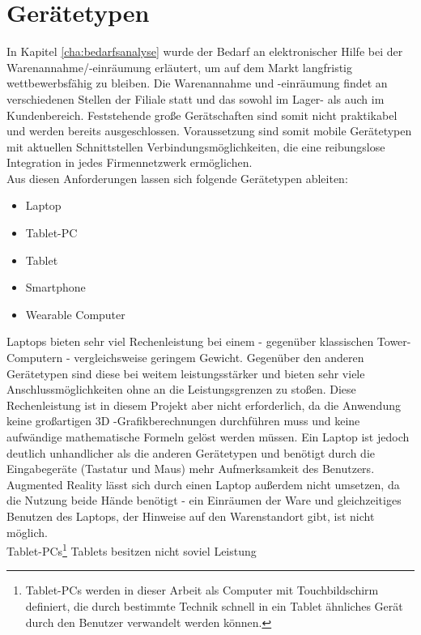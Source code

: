 \section{Gerätetypen}
\label{sec:geraete}
In Kapitel \ref{cha:bedarfsanalyse}  wurde der Bedarf an elektronischer Hilfe bei der Warenannahme/-einräumung erläutert, um auf dem Markt langfristig wettbewerbsfähig zu bleiben. Die Warenannahme und -einräumung findet an verschiedenen Stellen der Filiale statt und das sowohl im Lager- als auch im Kundenbereich. Feststehende große Gerätschaften sind somit nicht praktikabel und werden bereits ausgeschlossen. Voraussetzung sind somit mobile Gerätetypen mit aktuellen Schnittstellen \bzw Verbindungsmöglichkeiten, die eine reibungslose Integration in jedes Firmennetzwerk ermöglichen.\\
Aus diesen Anforderungen lassen sich folgende Gerätetypen ableiten:
\begin{itemize}
	\item Laptop
	\item Tablet-PC
	\item Tablet
	\item Smartphone
	\item Wearable Computer
\end{itemize}
Laptops bieten sehr viel Rechenleistung bei einem - gegenüber klassischen Tower-Computern - vergleichsweise geringem Gewicht. Gegenüber den anderen Gerätetypen sind diese bei weitem leistungsstärker und bieten sehr viele Anschlussmöglichkeiten ohne an die Leistungsgrenzen zu stoßen. Diese Rechenleistung ist in diesem Projekt aber nicht erforderlich, da die Anwendung keine großartigen \ac{3D} -Grafikberechnungen durchführen muss und keine aufwändige mathematische Formeln gelöst werden müssen. Ein Laptop ist jedoch deutlich unhandlicher als die anderen Gerätetypen und benötigt durch die Eingabegeräte (Tastatur und Maus) mehr Aufmerksamkeit des Benutzers. Augmented Reality lässt sich durch einen Laptop außerdem nicht umsetzen, da die Nutzung beide Hände benötigt - ein Einräumen der Ware und gleichzeitiges Benutzen des Laptops, der Hinweise auf den Warenstandort gibt, ist nicht möglich.\\

Tablet-PCs\footnote{Tablet-PCs werden in dieser Arbeit als Computer mit Touchbildschirm definiert, die durch bestimmte Technik schnell in ein Tablet ähnliches Gerät durch den Benutzer verwandelt werden können.} \bzw Tablets besitzen nicht soviel Leistung 

